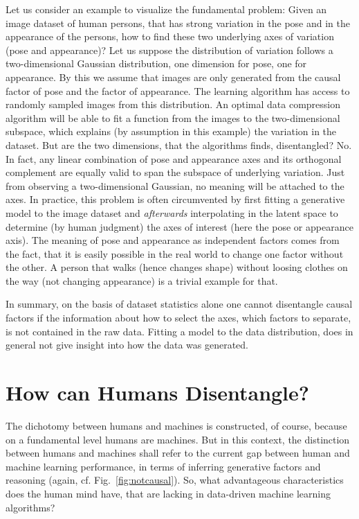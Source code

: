 	Let us consider an example to visualize the fundamental problem: Given an image dataset of human persons, that has strong variation in the pose and in the appearance of the persons, how to find these two underlying axes of variation (pose and appearance)? Let us suppose the distribution of variation follows a two-dimensional Gaussian distribution, one dimension for pose, one for appearance. By this we assume that images are only generated from the causal factor of pose and the factor of appearance.
	The learning algorithm has access to randomly sampled images from this distribution. An optimal data compression algorithm will be able to fit a function from the images to the two-dimensional subspace, which explains (by assumption in this example) the variation in the dataset.
	But are the two dimensions, that the algorithms finds, disentangled? No. In fact, any linear combination of pose and appearance axes and its orthogonal complement are equally valid to span the subspace of underlying variation. Just from observing a two-dimensional Gaussian, no meaning will be attached to the axes. In practice, this problem is often circumvented by first fitting a generative model to the image dataset and \textit{afterwards} interpolating in the latent space to determine (by human judgment) the axes of interest (here the pose or appearance axis). The meaning of pose and appearance as independent factors comes from the fact, that it is easily possible in the real world to change one factor without the other. A person that walks (hence changes shape) without loosing clothes on the way (not changing appearance) is a trivial example for that.

	In summary, on the basis of dataset statistics alone one cannot disentangle causal factors if the information about how to select the axes, \ie which factors to separate, is not contained in the raw data.
	Fitting a model to the data distribution, does in general not give insight into how the data was generated.

\section{How can Humans Disentangle?}

	The dichotomy between humans and machines is constructed, of course, because on a fundamental level humans are machines. But in this context, the distinction between humans and machines shall refer to the current gap between human and machine learning performance, in terms of inferring generative factors and reasoning (again, cf. Fig.~\ref{fig:notcausal}).
	So, what advantageous characteristics does the human mind have, that are lacking in data-driven machine learning algorithms?

